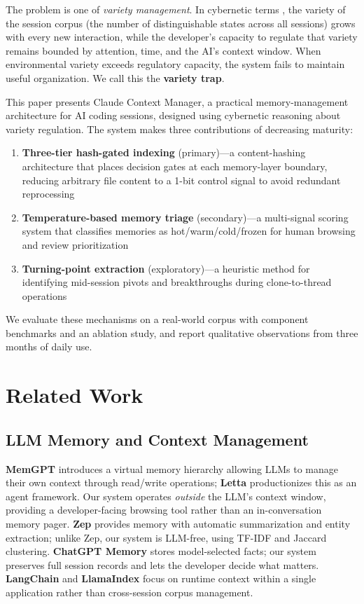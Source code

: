 \documentclass[11pt]{article}
\begin{document}
The problem is one of \emph{variety management}. In cybernetic terms \citep{ashby1956}, the variety of the session corpus (the number of distinguishable states across all sessions) grows with every new interaction, while the developer's capacity to regulate that variety remains bounded by attention, time, and the AI's context window. When environmental variety exceeds regulatory capacity, the system fails to maintain useful organization. We call this the \textbf{variety trap}.

This paper presents Claude Context Manager, a practical memory-management architecture for AI coding sessions, designed using cybernetic reasoning about variety regulation. The system makes three contributions of decreasing maturity:

\begin{enumerate}[nosep]
  \item \textbf{Three-tier hash-gated indexing} (primary)---a content-hashing architecture that places decision gates at each memory-layer boundary, reducing arbitrary file content to a 1-bit control signal to avoid redundant reprocessing
  \item \textbf{Temperature-based memory triage} (secondary)---a multi-signal scoring system that classifies memories as hot/warm/cold/frozen for human browsing and review prioritization
  \item \textbf{Turning-point extraction} (exploratory)---a heuristic method for identifying mid-session pivots and breakthroughs during clone-to-thread operations
\end{enumerate}

We evaluate these mechanisms on a real-world corpus with component benchmarks and an ablation study, and report qualitative observations from three months of daily use.

\section{Related Work}

\subsection{LLM Memory and Context Management}

\textbf{MemGPT} \citep{packer2023memgpt} introduces a virtual memory hierarchy allowing LLMs to manage their own context through read/write operations; \textbf{Letta} \citep{letta2024} productionizes this as an agent framework. Our system operates \emph{outside} the LLM's context window, providing a developer-facing browsing tool rather than an in-conversation memory pager. \textbf{Zep} \citep{zep2024} provides memory with automatic summarization and entity extraction; unlike Zep, our system is LLM-free, using TF-IDF and Jaccard clustering. \textbf{ChatGPT Memory} \citep{openai2024memory} stores model-selected facts; our system preserves full session records and lets the developer decide what matters. \textbf{LangChain} \citep{chase2022langchain} and \textbf{LlamaIndex} \citep{liu2022llamaindex} focus on runtime context within a single application rather than cross-session corpus management.
\end{document}

